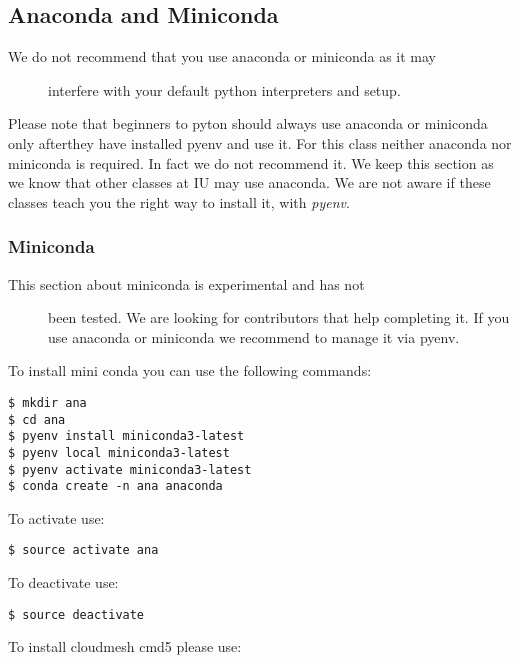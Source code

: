 \subsection{Anaconda and Miniconda}\label{anaconda-and-miniconda}

\begin{description}
\item[We do not recommend that you use anaconda or miniconda as it may]
interfere with your default python interpreters and setup.
\end{description}

Please note that beginners to pyton should always use anaconda or
miniconda only afterthey have installed pyenv and use it. For this class
neither anaconda nor miniconda is required. In fact we do not recommend
it. We keep this section as we know that other classes at IU may use
anaconda. We are not aware if these classes teach you the right way to
install it, with \emph{pyenv}.

\subsubsection{Miniconda}\label{miniconda}

\begin{description}
\item[This section about miniconda is experimental and has not]
been tested. We are looking for contributors that help completing it. If
you use anaconda or miniconda we recommend to manage it via pyenv.
\end{description}

To install mini conda you can use the following commands:

\begin{verbatim}
$ mkdir ana
$ cd ana
$ pyenv install miniconda3-latest
$ pyenv local miniconda3-latest
$ pyenv activate miniconda3-latest
$ conda create -n ana anaconda
\end{verbatim}

To activate use:

\begin{verbatim}
$ source activate ana
\end{verbatim}

To deactivate use:

\begin{verbatim}
$ source deactivate
\end{verbatim}

To install cloudmesh cmd5 please use:

